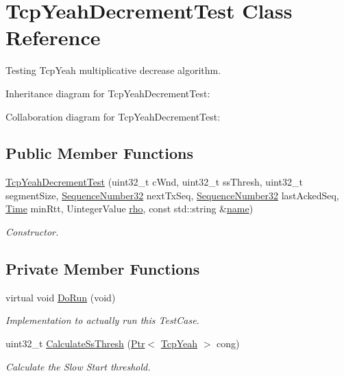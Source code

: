 \hypertarget{classTcpYeahDecrementTest}{}\section{Tcp\+Yeah\+Decrement\+Test Class Reference}
\label{classTcpYeahDecrementTest}


Testing Tcp\+Yeah multiplicative decrease algorithm.  




Inheritance diagram for Tcp\+Yeah\+Decrement\+Test\+:


Collaboration diagram for Tcp\+Yeah\+Decrement\+Test\+:
\subsection*{Public Member Functions}
\begin{DoxyCompactItemize}
\item 
\hyperlink{classTcpYeahDecrementTest_ae8ca002a9680addc18b26cdaed213710}{Tcp\+Yeah\+Decrement\+Test} (uint32\+\_\+t c\+Wnd, uint32\+\_\+t ss\+Thresh, uint32\+\_\+t segment\+Size, \hyperlink{group__network_gacb2070e4e98d2d5135c9bede58f07a03}{Sequence\+Number32} next\+Tx\+Seq, \hyperlink{group__network_gacb2070e4e98d2d5135c9bede58f07a03}{Sequence\+Number32} last\+Acked\+Seq, \hyperlink{classns3_1_1Time}{Time} min\+Rtt, Uinteger\+Value \hyperlink{loss__ITU1411__NLOS__over__rooftop_8m_ab8ec92cc3ea8422c9349409bae98d2a0}{rho}, const std\+::string \&\hyperlink{generate__test__data__lte__spectrum__model_8m_ab74e6bf80237ddc4109968cedc58c151}{name})
\begin{DoxyCompactList}\small\item\em Constructor. \end{DoxyCompactList}\end{DoxyCompactItemize}
\subsection*{Private Member Functions}
\begin{DoxyCompactItemize}
\item 
virtual void \hyperlink{classTcpYeahDecrementTest_a699fd95f30a62b6570bce1a2d60780b3}{Do\+Run} (void)
\begin{DoxyCompactList}\small\item\em Implementation to actually run this Test\+Case. \end{DoxyCompactList}\item 
uint32\+\_\+t \hyperlink{classTcpYeahDecrementTest_ac718766c0cb1a19751cf1e4ad88f7d85}{Calculate\+Ss\+Thresh} (\hyperlink{classns3_1_1Ptr}{Ptr}$<$ \hyperlink{classns3_1_1TcpYeah}{Tcp\+Yeah} $>$ cong)
\begin{DoxyCompactList}\small\item\em Calculate the Slow Start threshold. \end{DoxyCompactList}\end{DoxyCompactItemize}
